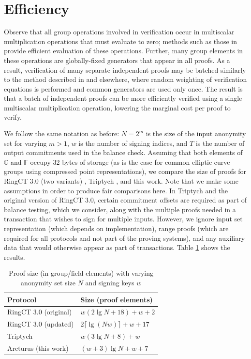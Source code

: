 \documentclass{article}
\newcommand{\G}{\mathbb{G}}
\newcommand{\F}{\mathbb{F}}
\theoremstyle{definition}
\begin{document}
\section{Efficiency}
Observe that all group operations involved in verification occur in multiscalar multiplication operations that must evaluate to zero; methods such as those in \cite{straus,pippenger} provide efficient evaluation of these operations.
Further, many group elements in these operations are globally-fixed generators that appear in all proofs.
As a result, verification of many separate independent proofs may be batched similarly to the method described in \cite{bulletproofs} and elsewhere, where random weighting of verification equations is performed and common generators are used only once.
The result is that a batch of independent proofs can be more efficiently verified using a single multiscalar multiplication operation, lowering the marginal cost per proof to verify.

We follow the same notation as before: $N = 2^m$ is the size of the input anonymity set for varying $m > 1$, $w$ is the number of signing indices, and $T$ is the number of output commitments used in the balance check.
Assuming that both elements of $\G$ and $\F$ occupy $32$ bytes of storage (as is the case for common elliptic curve groups using compressed point representations), we compare the size of proofs for RingCT 3.0 (two variants) \cite{rct3}, Triptych \cite{triptych}, and this work.
Note that we make some assumptions in order to produce fair comparisons here.
In Triptych and the original version of RingCT 3.0, certain commitment offsets are required as part of balance testing, which we consider, along with the multiple proofs needed in a transaction that wishes to sign for multiple inputs.
However, we ignore input set representation (which depends on implementation), range proofs (which are required for all protocols and not part of the proving systems), and any auxiliary data that would otherwise appear as part of transactions.
Table \ref{table:size} shows the results.

\begin{table}
\centering
\begin{tabular}{|ll|}
\hline
Protocol & Size (proof elements) \\
\hline
RingCT 3.0 (original) \cite{rct3} & $w(2 \lg N + 18) + w + 2$ \\
RingCT 3.0 (updated) \cite{rct3} & $2\lceil \lg(Nw) \rceil + w + 17$ \\
Triptych \cite{triptych} & $w(3 \lg N + 8) + w$ \\
Arcturus (this work) & $(w + 3)\lg N + w + 7$ \\
\hline
\end{tabular}
\caption{Proof size (in group/field elements) with varying anonymity set size $N$ and signing keys $w$}
\label{table:size}
\end{table}
\end{document}
